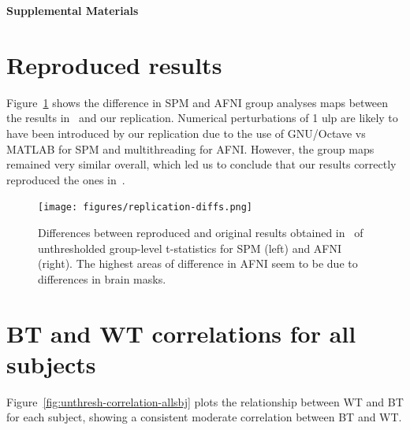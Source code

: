 \documentclass[11pt,onecolumn]{article}
\begin{document}



\clearpage

\setcounter{equation}{0}
\setcounter{figure}{0}
\setcounter{table}{0}
\setcounter{section}{0}

\makeatletter
\renewcommand{\theequation}{S\arabic{equation}}
\renewcommand{\thefigure}{S\arabic{figure}}
\renewcommand{\thesection}{S\arabic{section}}

\textbf{\centering \Large Supplemental Materials}

\section{Reproduced results}
\label{sec:supp-repro}

Figure~\ref{fig:replication-diff} shows the difference in SPM and AFNI
group analyses maps between the results in~\cite{bowring2019exploring} and
our replication. Numerical perturbations of 1 ulp are likely to have been
introduced by our replication due to the use of GNU/Octave vs MATLAB for SPM
and multithreading for AFNI.
  However, the group maps remained very similar
overall, which led us to conclude that our results correctly reproduced
the ones in~\cite{bowring2019exploring}.
\begin{figure}[ht]
  \texttt{[image: figures/replication-diffs.png]}
  \caption{Differences between reproduced and original results obtained in~\cite{bowring2019exploring}
    of unthresholded group-level t-statistics for SPM (left) and AFNI
    (right). The highest areas of difference in AFNI seem to be due to
    differences in brain masks.}
  \label{fig:replication-diff}
\end{figure}

\section{BT and WT correlations for all subjects}
\label{sec:supp-subjects}

Figure~\ref{fig:unthresh-correlation-allsbj} plots the relationship between
WT and BT for each subject, showing a consistent moderate correlation between BT and
WT.
\end{document}
